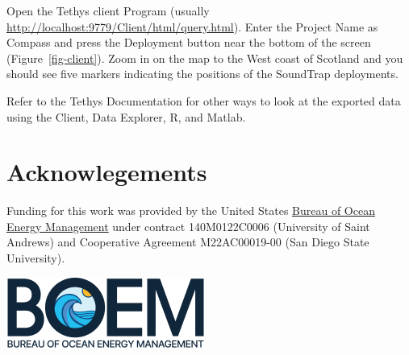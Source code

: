 \documentclass[
]{article}
\begin{document}
Open the Tethys client Program (usually
\url{http://localhost:9779/Client/html/query.html}). Enter the Project
Name as Compass and press the Deployment button near the bottom of the
screen (Figure~\ref{fig-client}). Zoom in on the map to the West coast
of Scotland and you should see five markers indicating the positions of
the SoundTrap deployments.

Refer to the Tethys Documentation for other ways to look at the exported
data using the Client, Data Explorer, R, and Matlab.

\section{Acknowlegements}\label{acknowlegements}

Funding for this work was provided by the United States
\href{https://www.boem.gov/}{Bureau of Ocean Energy Management} under
contract 140M0122C0006 (University of Saint Andrews) and Cooperative
Agreement M22AC00019-00 (San Diego State University).

\href{https://www.boem.gov/}{\includegraphics[width=0.33\linewidth,height=\textheight,keepaspectratio]{media/BOEM_Logo_Web_Header.png}}
\end{document}
